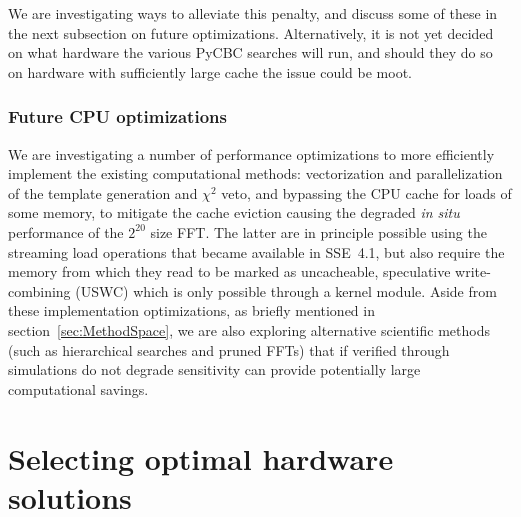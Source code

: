 We are investigating ways to alleviate this penalty, and discuss some of these
in the next subsection on future optimizations. Alternatively, it is not yet
decided on what hardware the various PyCBC searches will run, and should they do
so on hardware with sufficiently large cache the issue could be moot.

\vspace*{-10pt}
\subsubsection{Future CPU optimizations}
\vspace*{-05pt}

We are investigating a number of performance optimizations to more efficiently
implement the existing computational methods: vectorization and parallelization
of the template generation and $\chi^2$ veto, and bypassing the CPU cache for
loads of some memory, to mitigate the cache eviction causing the degraded
\textit{in situ} performance of the $2^{20}$ size FFT. The latter are in
principle possible using the streaming load operations that became available in
SSE~4.1, but also require the memory from which they read to be marked as
uncacheable, speculative write-combining (USWC) which is only possible through a
kernel module. Aside from these implementation optimizations, as briefly
mentioned in section~\ref{sec:MethodSpace}, we are also exploring alternative
scientific methods (such as hierarchical searches and pruned FFTs) that if
verified through simulations do not degrade sensitivity can provide potentially
large computational savings.

\vspace*{-10pt}
\section{Selecting optimal hardware solutions}
\vspace*{-05pt}
\label{sec:offline-trade-study}


